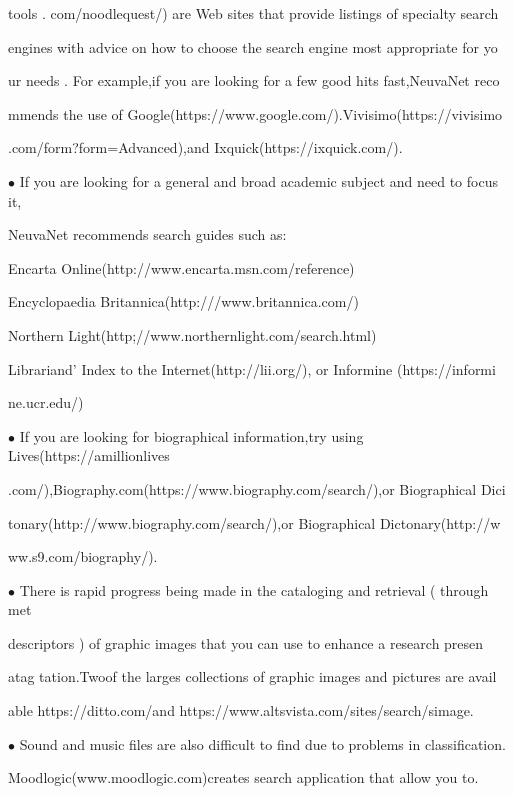 \documentclass[10pt,a4paper]{book}
\begin{document}
\quad tools . com/noodlequest/) are Web sites that provide listings of specialty search 

\quad engines with advice on how to choose the search engine most appropriate for yo

\quad ur needs . For example,if you are looking for a few good hits fast,NeuvaNet reco

\quad  mmends the use of Google(https://www.google.com/).Vivisimo(https://vivisimo

\quad .com/form?form=Advanced),and Ixquick(https://ixquick.com/).

$\bullet$ If you are looking for a general and broad academic subject and need to focus it,

\quad NeuvaNet recommends search guides such as:

\qquad Encarta Online(http://www.encarta.msn.com/reference)

\qquad Encyclopaedia Britannica(http:///www.britannica.com/)

\qquad Northern Light(http;//www.northernlight.com/search.html)

\qquad Librariand' Index to the Internet(http://lii.org/), or Informine (https://informi

\qquad ne.ucr.edu/)

$\bullet$ If you are looking for biographical information,try using Lives(https://amillionlives

\quad .com/),Biography.com(https://www.biography.com/search/),or Biographical Dici

\quad  tonary(http://www.biography.com/search/),or Biographical Dictonary(http://w

\quad ww.s9.com/biography/).

$\bullet$ There is rapid progress being made in the cataloging and retrieval ( through met

\quad descriptors ) of graphic images that you can use to enhance a research presen 

\quad atag tation.Twoof the larges collections of graphic images and pictures are avail

\quad  able https://ditto.com/and https://www.altsvista.com/sites/search/simage.

$\bullet$ Sound and music files are also difficult to find due to problems in classification.

\quad Moodlogic(www.moodlogic.com)creates search application that allow you to.
\end{document}
